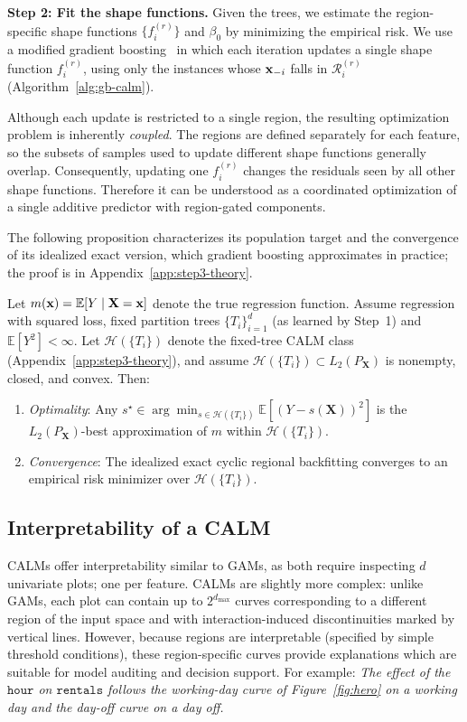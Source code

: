 \textbf{Step 2: Fit the shape functions.}
Given the trees, we estimate the region-specific shape functions $\{f_i^{(r)}\}$ and $\beta_0$ by minimizing the empirical risk.
We use a modified gradient boosting~\cite{buhlmann2007boosting} in which each iteration updates a single shape function $f_i^{(r)}$, using only the instances whose $\mathbf{x}_{-i}$ falls in $\mathcal{R}_i^{(r)}$ (Algorithm~\ref{alg:gb-calm}).

Although each update is restricted to a single region, the resulting optimization problem is inherently \emph{coupled}.
The regions are defined separately for each feature, so the subsets of samples used to update different shape functions generally overlap.
Consequently, updating one $f_i^{(r)}$ changes the residuals seen by all other shape functions.
Therefore it can be understood as a coordinated optimization of a single additive predictor with region-gated components.

The following proposition characterizes its population target and the convergence of its idealized exact version, which gradient boosting approximates in practice; the proof is in Appendix~\ref{app:step3-theory}.

\begin{proposition}
\label{prop:step3-main}
Let $m(\mathbf{x}) = \mathbb{E}[Y \mid \mathbf{X}=\mathbf{x}]$ denote the true regression function. Assume regression with squared loss, fixed partition trees $\{T_i\}_{i=1}^d$ (as learned by Step~1) and $\mathbb{E}[Y^2]<\infty$.
Let $\mathcal{H}(\{T_i\})$ denote the fixed-tree CALM class (Appendix~\ref{app:step3-theory}), and assume
$\mathcal{H}(\{T_i\})\subset L_2(P_{\mathbf{X}})$ is nonempty, closed, and convex.
Then:
\begin{enumerate}
    \item \emph{Optimality}: 
    Any 
    $s^\star \in \arg\min_{s\in\mathcal{H}(\{T_i\})} \mathbb{E}[(Y-s(\mathbf{X}))^2]$
    is the $L_2(P_{\mathbf{X}})$-best approximation of $m$ within $\mathcal{H}(\{T_i\})$.
    \item \emph{Convergence}: The idealized exact cyclic regional backfitting converges to an empirical risk minimizer over $\mathcal{H}(\{T_i\})$.
\end{enumerate}
\end{proposition}

\subsection{Interpretability of a CALM} \label{subsec:interpretability-properties}
CALMs offer interpretability similar to GAMs, as both require inspecting $d$ univariate plots; one per feature.
CALMs are slightly more complex: unlike GAMs, each plot can contain up to $2^{d_{\max}}$ curves corresponding to a different region of the input space and with interaction-induced discontinuities marked by vertical lines.
However, because regions are interpretable (specified by simple threshold conditions), these region-specific curves provide explanations which are suitable for model auditing and decision support.
For example:
\textit{The effect of the $\mathtt{hour}$ on $\mathtt{rentals}$ follows the working-day curve of Figure~\ref{fig:hero} on a working day and the day-off curve on a day off.}

